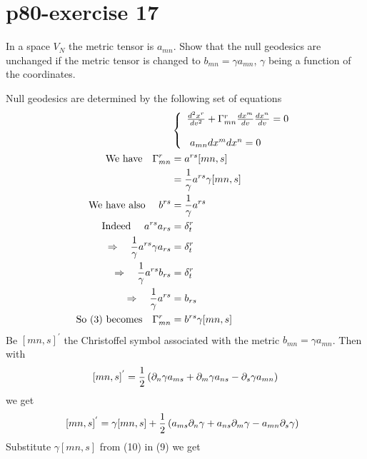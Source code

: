 \section{p80-exercise 17}
\begin{tcolorbox}
In a space $V_N$ the metric tensor is $a_{mn}$. Show that the null geodesics are unchanged if the metric tensor is changed to $b_{mn} = \gamma a_{mn} $, $\gamma$ being a function of the coordinates.
\end{tcolorbox}
Null geodesics are determined by the following set of equations
\begin{align}
\ & \left \{  \begin {array}{l}
\dv[2]{x^r}{v} + \Gamma^r_{mn}\dv{x^m}{v}\dv{x^n}{v} = 0\\\\
\ a_{mn}dx^mdx^n =0
\end{array}\right.\\
\text{We have}\quad  \Gamma^r_{mn} & = a^{rs}[mn,s]\\
\ & = \frac{1}{\gamma}a^{rs}\gamma[mn,s]\\
\text{We have also }\quad  b^{rs} & = \frac{1}{\gamma}a^{rs}\\
\text{Indeed }\quad  a^{rs}a_{rs}&= \delta^r_t\\
\Rightarrow\quad  \frac{1}{\gamma}a^{rs}\gamma a_{rs}&= \delta^r_t\\
\Rightarrow\quad  \frac{1}{\gamma}a^{rs}b_{rs}&= \delta^r_t\\
\Rightarrow\quad  \frac{1}{\gamma}a^{rs} &= b_{rs}\\
\text{So (3) becomes}\quad  \Gamma^r_{mn} & =b^{rs}\gamma[mn,s]
\end{align}
Be $ [mn,s]^{'} $ the Christoffel symbol associated with the metric $b_{mn}= \gamma a_{mn}$. Then with  $$[mn,s]^{'} = \frac{1}{2} \left(\partial_n \gamma a_{ms}+\partial_m \gamma a_{ns}-\partial_s \gamma a_{mn} \right)$$ we get
\begin{align}
\ [mn,s]^{'} &= \gamma [mn,s] + \frac{1}{2}\left( a_{ms}\partial_n \gamma+a_{ns}\partial_m \gamma-a_{mn}\partial_s \gamma \right)
\end{align}
Substitute $\gamma [mn,s]$ from (10) in (9) we get
